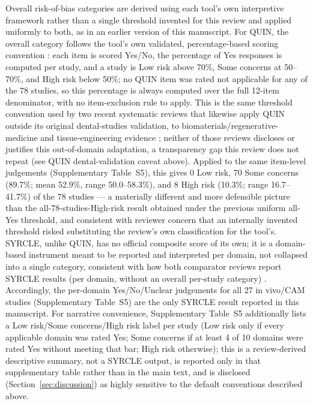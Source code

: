\documentclass[5p,times,twocolumn]{elsarticle}
\begin{document}
Overall risk-of-bias categories are derived using each tool's own interpretive framework rather than a single threshold invented for this review and applied uniformly to both, as in an earlier version of this manuscript. For QUIN, the overall category follows the tool's own validated, percentage-based scoring convention \cite{ref84}: each item is scored Yes/No, the percentage of Yes responses is computed per study, and a study is Low risk above 70\%, Some concerns at 50--70\%, and High risk below 50\%; no QUIN item was rated not applicable for any of the 78 studies, so this percentage is always computed over the full 12-item denominator, with no item-exclusion rule to apply. This is the same threshold convention used by two recent systematic reviews that likewise apply QUIN outside its original dental-studies validation, to biomaterials/regenerative-medicine and tissue-engineering evidence \cite{ref90,ref91}; neither of those reviews discloses or justifies this out-of-domain adaptation, a transparency gap this review does not repeat (see QUIN dental-validation caveat above). Applied to the same item-level judgements (Supplementary Table~S5), this gives 0 Low risk, 70 Some concerns (89.7\%; mean 52.9\%, range 50.0--58.3\%), and 8 High risk (10.3\%; range 16.7--41.7\%) of the 78 studies --- a materially different and more defensible picture than the all-78-studies-High-risk result obtained under the previous uniform all-Yes threshold, and consistent with reviewer concern that an internally invented threshold risked substituting the review's own classification for the tool's. SYRCLE, unlike QUIN, has no official composite score of its own; it is a domain-based instrument meant to be reported and interpreted per domain, not collapsed into a single category, consistent with how both comparator reviews report SYRCLE results (per domain, without an overall per-study category) \cite{ref90,ref91}. Accordingly, the per-domain Yes/No/Unclear judgements for all 27 in vivo/CAM studies (Supplementary Table~S5) are the only SYRCLE result reported in this manuscript. For narrative convenience, Supplementary Table~S5 additionally lists a Low risk/Some concerns/High risk label per study (Low risk only if every applicable domain was rated Yes; Some concerns if at least 4 of 10 domains were rated Yes without meeting that bar; High risk otherwise); this is a review-derived descriptive summary, not a SYRCLE output, is reported only in that supplementary table rather than in the main text, and is disclosed (Section~\ref{sec:discussion}) as highly sensitive to the default conventions described above.
\end{document}
